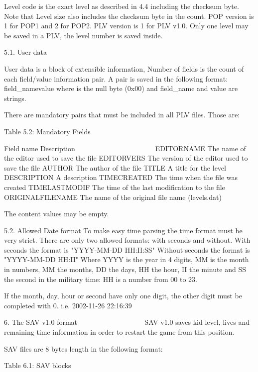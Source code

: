  Level code is the exact level as described in 4.4 including the checksum
 byte. Note that Level size also includes the checksum byte in the count.
 POP version is 1 for POP1 and 2 for POP2.
 PLV version is 1 for PLV v1.0.
 Only one level may be saved in a PLV, the level number is saved inside.

5.1. User data

 User data is a block of extensible information, Number of fields is the
 count of each field/value information pair. A pair is saved in the
 following format:
  field_name\0value\0
 where \0 is the null byte (0x00) and field_name and value are strings.

 There are mandatory pairs that must be included in all PLV files.
 Those are:

                   Table 5.2: Mandatory Fields
                   ~~~~~~~~~~~~~~~~~~~~~~~~~~~

  Field name          Description
  ~~~~~~~~~~          ~~~~~~~~~~~
  EDITORNAME          The name of the editor used to save the file
  EDITORVERS          The version of the editor used to save the file
  AUTHOR              The author of the file
  TITLE               A title for the level
  DESCRIPTION         A description
  TIMECREATED         The time when the file was created
  TIMELASTMODIF       The time of the last modification to the file
  ORIGINALFILENAME    The name of the original file name (levels.dat)

 The content values may be empty.

5.2. Allowed Date format
 To make easy time parsing the time format must be very strict.
 There are only two allowed formats: with seconds and without.
 With seconds the format is "YYYY-MM-DD HH:II:SS"
 Without seconds the format is "YYYY-MM-DD HH:II"
 Where YYYY is the year in 4 digits, MM is the month in numbers, MM the
 months, DD the days, HH the hour, II the minute and SS the second in the
 military time: HH is a number from 00 to 23.
 
 If the month, day, hour or second have only one digit, the other digit
 must be completed with 0.
 i.e. 2002-11-26 22:16:39


6. The SAV v1.0 format
   ~~~ ~~~ ~~~~ ~~~~~~
 SAV v1.0 saves kid level, lives and remaining time information in order to
 restart the game from this position.

 SAV files are 8 bytes length in the following format:
 
                   Table 6.1: SAV blocks
                   ~~~~~~~~~~~~~~~~~~~~~

